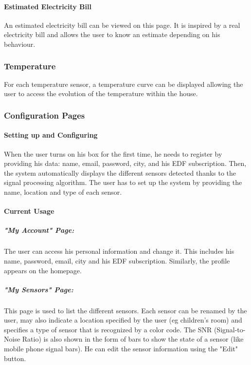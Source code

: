     \paragraph{Estimated Electricity Bill}
    An estimated electricity bill can be viewed on this page. It is inspired by a real electricity bill and allows the user to know an estimate depending on his behaviour.
\subsubsection{Temperature}
    For each temperature sensor, a temperature curve can be displayed allowing the user to access the evolution of the temperature within the house. 
\subsubsection{Configuration Pages}
    
    \paragraph{Setting up and Configuring} %
    
    When the user turns on his box for the first time, he needs to register by providing his data: name, email, password, city, and his EDF subscription. Then, the system automatically displays the different sensors detected thanks to the signal processing algorithm. The user has to set up the system by providing the name, location and type of each sensor. %
    
    \paragraph{Current Usage} %
    
    \subparagraph{"My Account" Page:} 
    The user can access his personal information and change it. This includes his name, password, email, city and his EDF subscription. Similarly, the profile appears on the homepage.
    
    \subparagraph{"My Sensors" Page:}
    This page is used to list the different sensors. Each sensor can be renamed by the user, may also indicate a location specified by the user (eg children's room) and specifies a type of sensor that is recognized by a color code. The SNR (Signal-to-Noise Ratio) is also shown in the form of bars to show the state of a sensor (like mobile phone signal bars). He can edit the sensor information using the "Edit" button.